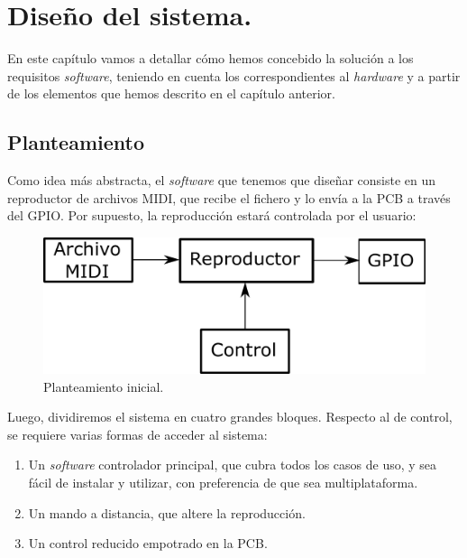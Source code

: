 \chapter{Diseño del sistema.}
\label{cap: capitulo_4}

En este capítulo vamos a detallar cómo hemos concebido la solución a los requisitos \textit{software}, teniendo en cuenta los correspondientes al \textit{hardware} y a partir de los elementos que hemos descrito en el capítulo anterior.

\section{Planteamiento}

Como idea más abstracta, el \textit{software} que tenemos que diseñar consiste en un reproductor de archivos \acrshort{MIDI}, que recibe el fichero y lo envía a la \acrshort{PCB} a través del \acrshort{GPIO}. Por supuesto, la reproducción estará controlada por el usuario:

\smallskip

\begin{figure}[H]
	\noindent \begin{centering}
		\includegraphics[width=\linewidth/2]{capitulo4/idea}
		\par\end{centering}
	\smallskip
	\caption{\label{fig:idea} Planteamiento inicial.}
\end{figure} 

\smallskip

Luego, dividiremos el sistema en cuatro grandes bloques. Respecto al de control, se requiere varias formas de acceder al sistema:

\begin{enumerate}
	\item Un \textit{software} controlador principal, que cubra todos los casos de uso, y sea fácil de instalar y utilizar, con preferencia de que sea multiplataforma.
	
	\item Un mando a distancia, que altere la reproducción.
	
	\item Un control reducido empotrado en la \acrshort{PCB}.
\end{enumerate}

